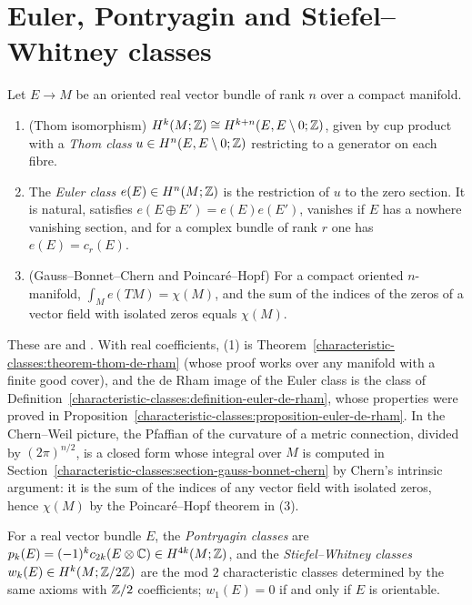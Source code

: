 \section{Euler, Pontryagin and Stiefel--Whitney classes}\label{characteristic-classes:section-euler}

\begin{theorem}\label{characteristic-classes:theorem-euler}
Let $E \to M$ be an oriented real vector bundle of rank $n$ over a compact manifold.
\begin{enumerate}
\item (Thom isomorphism) $H^{k}(M; \mathbb{Z}) \cong H^{k+n}(E, E \setminus 0; \mathbb{Z})$, given by cup product with a \emph{Thom class} $u \in H^n(E, E \setminus 0; \mathbb{Z})$ restricting to a generator on each fibre.
\item The \emph{Euler class} $e(E) \in H^n(M; \mathbb{Z})$ is the restriction of $u$ to the zero section. It is natural, satisfies $e(E \oplus E') = e(E)e(E')$, vanishes if $E$ has a nowhere vanishing section, and for
a complex bundle of rank $r$ one has $e(E) = c_r(E)$.
\item (Gauss--Bonnet--Chern and Poincar\'e--Hopf) For a compact oriented $n$-manifold, $\int_Me(TM) = \chi(M)$, and the sum of the indices of the zeros of a vector field with isolated zeros equals $\chi(M)$.
\end{enumerate}
\end{theorem}

These are \cite[Chapters 9--11]{milnor-stasheff} and \cite[Chapter 6]{bott-tu}. With real coefficients, (1) is Theorem~\ref{characteristic-classes:theorem-thom-de-rham} (whose proof works over
any manifold with a finite good cover), and the de Rham image of the Euler class is the class of Definition~\ref{characteristic-classes:definition-euler-de-rham}, whose
properties were proved in Proposition~\ref{characteristic-classes:proposition-euler-de-rham}. In the Chern--Weil picture, the Pfaffian of the curvature of a metric connection, divided by
$(2\pi)^{n/2}$, is a closed form whose integral over $M$ is computed in Section~\ref{characteristic-classes:section-gauss-bonnet-chern} by Chern's intrinsic argument: it is the sum of the
indices of any vector field with isolated zeros, hence $\chi(M)$ by the Poincar\'e--Hopf theorem in (3).

\begin{definition}\label{characteristic-classes:definition-pontryagin}
For a real vector bundle $E$, the \emph{Pontryagin classes} are $p_k(E) = (-1)^kc_{2k}(E \otimes \mathbb{C}) \in H^{4k}(M; \mathbb{Z})$, and the \emph{Stiefel--Whitney classes} $w_k(E) \in H^k(M; \mathbb{Z}/2\mathbb{Z})$ are the mod $2$
characteristic classes determined by the same axioms with $\mathbb{Z}/2$ coefficients; $w_1(E) = 0$ if and only if $E$ is orientable.
\end{definition}

